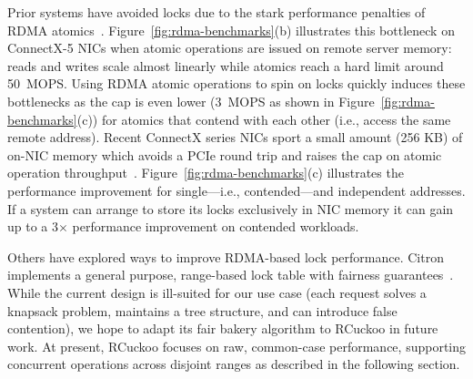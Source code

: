 
Prior systems have avoided locks due to the stark performance penalties of RDMA
atomics~\cite{design-guidelines}.  Figure~\ref{fig:rdma-benchmarks}(b)
illustrates this bottleneck on ConnectX-5 NICs when atomic operations are issued
on remote server memory: reads and writes scale almost linearly while atomics
reach a hard limit around 50~MOPS.  Using RDMA atomic operations to spin on
locks quickly induces these bottlenecks as the cap is even lower (3~MOPS as
shown in Figure~\ref{fig:rdma-benchmarks}(c)) for atomics that contend with each
other (i.e., access the same remote address).  Recent ConnectX series NICs sport
a small amount (256 KB) of on-NIC memory which avoids a PCIe round trip and
raises the cap on atomic operation
throughput~\cite{device-memory,sherman}. Figure~\ref{fig:rdma-benchmarks}(c)
illustrates the performance improvement for
single---i.e., contended---and independent addresses. If a system can arrange to
store its locks exclusively in NIC memory it can gain up to a 3$\times$ performance
improvement on contended workloads.

Others have explored ways to improve RDMA-based lock performance. Citron
implements a general purpose, range-based lock table with fairness
guarantees~\cite{citron}.  While the current design is ill-suited for our use
case (each request solves a knapsack problem, maintains a tree structure, and
can introduce false contention), we hope to adapt its fair bakery algorithm to
RCuckoo in future work.  At present, RCuckoo focuses on raw, common-case
performance, supporting concurrent operations across disjoint ranges as
described in the following section.





